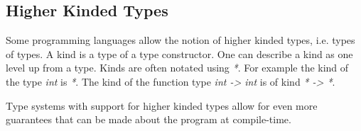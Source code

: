 \subsection{Higher Kinded Types}
\label{sub:higher_kinded_types}

Some programming languages allow the notion of higher kinded types, i.e. types of types. A kind is a type of a type constructor. One can describe a kind as one level up from a type. Kinds are often notated using \emph{*}. For example the kind of the type \emph{int} is \emph{*}. The kind of the function type \emph{int -> int} is of kind \emph{* -> *}.

Type systems with support for higher kinded types allow for even more guarantees that can be made about the program at compile-time.
